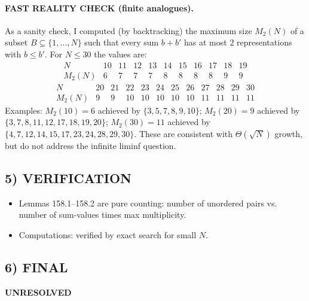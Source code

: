 \paragraph{FAST REALITY CHECK (finite analogues).}
As a sanity check, I computed (by backtracking) the maximum size $M_2(N)$ of a subset $B\subseteq\{1,\dots,N\}$ such that every sum $b+b'$ has at most $2$ representations with $b\le b'$.
For $N\le 30$ the values are:
\[
\begin{array}{c|cccccccccc}
N& 10&11&12&13&14&15&16&17&18&19\\\hline
M_2(N)& 6&7&7&7&8&8&8&8&9&9
\end{array}
\]
\[
\begin{array}{c|cccccccccc}
N& 20&21&22&23&24&25&26&27&28&29&30\\\hline
M_2(N)& 9&9&10&10&10&10&10&11&11&11&11
\end{array}
\]
Examples:
$M_2(10)=6$ achieved by $\{3,5,7,8,9,10\}$;
$M_2(20)=9$ achieved by $\{3,7,8,11,12,17,18,19,20\}$;
$M_2(30)=11$ achieved by $\{4,7,12,14,15,17,23,24,28,29,30\}$.
These are consistent with $\Theta(\sqrt N)$ growth, but do not address the infinite liminf question.

\subsection*{5) VERIFICATION}
\begin{itemize}
\item Lemmas 158.1--158.2 are pure counting: number of unordered pairs vs. number of sum-values times max multiplicity.
\item Computations: verified by exact search for small $N$.
\end{itemize}

\subsection*{6) FINAL}
\textbf{UNRESOLVED}

